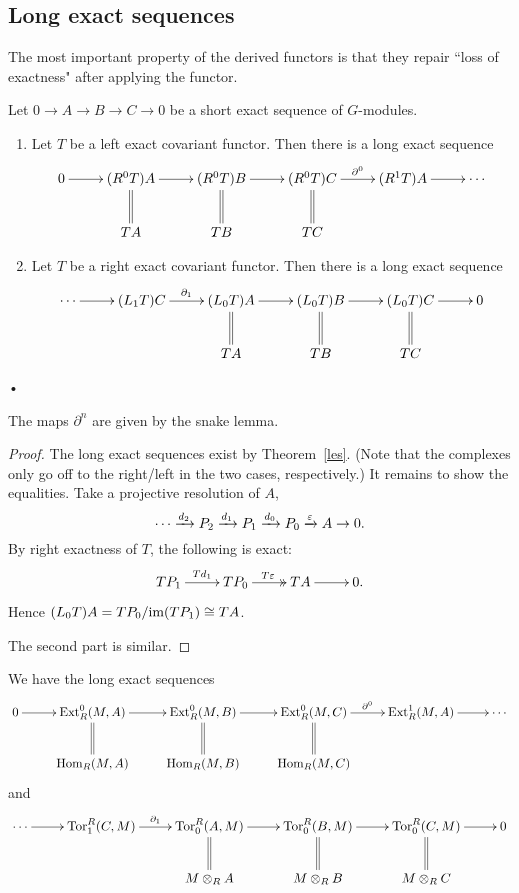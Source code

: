 \subsection{Long exact sequences}
The most important property of the derived functors is that they repair ``loss of exactness" after applying the functor.
\begin{thm}
Let $0\to A\to B\to C\to 0$ be a short exact sequence of $G$-modules. 
\begin{enumerate}
\item
Let $T$ be a left exact covariant functor. Then there is a long exact sequence
\[
\xymatrix{
0\ar[r]& (R^0T)A\ar[r]\ar@{=}[d]& (R^0T)B\ar[r]\ar@{=}[d]& (R^0T)C\ar[r]^{\partial^0}\ar@{=}[d]&(R^1T)A\ar[r]&\cdots\\
&TA &TB&TC & &
}
\]
\item
Let $T$ be a right exact covariant functor. Then there is a long exact sequence
\[
\xymatrix{
\cdots \ar[r]&
(L_1T)C\ar[r]^{\partial_1} &
(L_0T)A\ar[r] \ar@{=}[d] &
(L_0T)B\ar[r] \ar@{=}[d] &
(L_0T)C\ar[r] \ar@{=}[d] &
0\\
&& TA & TB & TC&
}
\]
\end{enumerate}•
\end{thm}
The maps $\partial^n$ are given by the snake lemma.
\begin{proof}
The long exact sequences exist by Theorem~\ref{les}. (Note that the complexes only go off to the right/left in the two cases, respectively.) It remains to show the equalities. Take a projective resolution of $A$, 
\[\cdots\xrightarrow{d_2} P_2\xrightarrow{d_1} P_1\xrightarrow{d_0} P_0 \xrightarrow{\varepsilon}A\to 0.\]
By right exactness of $T$, the following is exact:
\[
\xymatrix{
TP_1\ar[r]^{Td_1} & TP_0 \ar@{->>}[r]^{T\ep} & TA \ar[r] & 0.
}
\]
Hence $(L_0T)A=TP_0/\text{im}(TP_1)\cong TA$.

The second part is similar.
\end{proof}
\begin{cor}
We have the long exact sequences
\[
\xymatrix{
0\ar[r]& \Ext^0_R(M,A)\ar[r]\ar@{=}[d]& \Ext^0_R(M,B)\ar[r]\ar@{=}[d]& \Ext^0_R(M,C)\ar[r]^{\partial^0}\ar@{=}[d]&\Ext^1_R(M,A)\ar[r]&\cdots\\
&\Hom_R(M,A) &\Hom_R(M,B) &\Hom_R(M,C) & &
}
\]
and
\[
\xymatrix{
\cdots \ar[r]&
\Tor^R_1(C,M)\ar[r]^{\partial_1} &
\Tor^R_0(A,M)\ar[r] \ar@{=}[d] &
\Tor^R_0(B,M)\ar[r] \ar@{=}[d] &
\Tor^R_0(C,M)\ar[r] \ar@{=}[d] &
0\\
&& M\ot_R A & M\ot_R B& M\ot_R C&
}
\]
\end{cor}
